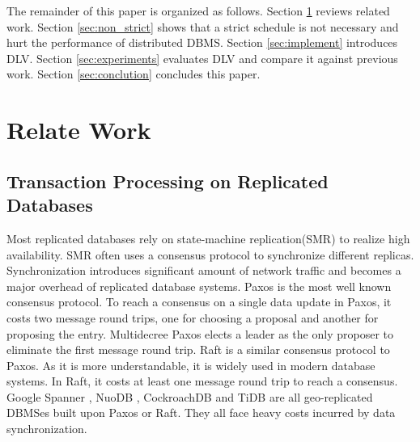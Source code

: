 \documentclass[conference]{IEEEtran}
\begin{document}
The remainder of this paper is organized as follows.
Section \ref{sec:relate_work} reviews related work.
Section \ref{sec:non_strict} shows that a strict schedule is not necessary and hurt the performance of distributed DBMS.
Section \ref{sec:implement} introduces DLV.
Section \ref{sec:experiments} evaluates DLV and compare it against previous work.
Section \ref{sec:conclution} concludes this paper.


\section{Relate Work}
\label{sec:relate_work}

\subsection{Transaction Processing on Replicated Databases}

Most replicated databases rely on state-machine replication(SMR) to realize high availability.
SMR often uses a consensus protocol to synchronize different replicas.
Synchronization introduces significant amount of network traffic and becomes a major overhead of replicated database systems.
Paxos \cite{Paxos:journals/tocs/Lamport98}\cite{PaxosSimple:conf/opodis/Lamport02} is the most well known consensus protocol.
To reach a consensus on a single data update in Paxos, it costs two message round trips, one for choosing a proposal and another for proposing the entry.
Multidecree Paxos\cite{Multidecree:journals/csur/RenesseA15} elects a leader as the only proposer to eliminate the first message round trip.
Raft\cite{Raft:conf/usenix/OngaroO14} is a similar consensus protocol to Paxos. As it is more understandable, it is widely used in modern database systems.
In Raft, it costs at least one message round trip to reach a consensus.
Google Spanner \cite{Spanner:conf/osdi/CorbettDEFFFGGHHHKKLLMMNQRRSSTWW12}\cite{Spanner:conf/sigmod/BaconBBCDFFGJKL17},
NuoDB \cite{NuoDB}, CockroachDB \cite{CockroachDB} and TiDB \cite{TiDB} are all geo-replicated DBMSes built upon Paxos or Raft.
They all face heavy costs incurred by data synchronization.
\end{document}
